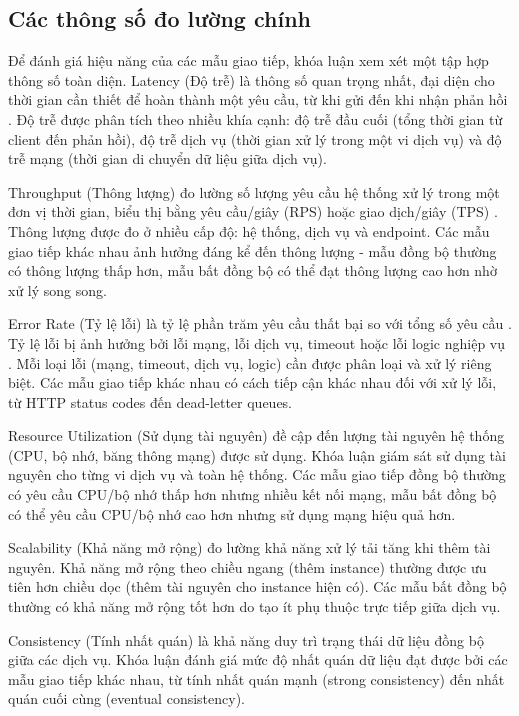 \subsection{Các thông số đo lường chính}
Để đánh giá hiệu năng của các mẫu giao tiếp, khóa luận xem xét một tập hợp thông số toàn diện. Latency (Độ trễ) là thông số quan trọng nhất, đại diện cho thời gian cần thiết để hoàn thành một yêu cầu, từ khi gửi đến khi nhận phản hồi \cite{jun2018}. Độ trễ được phân tích theo nhiều khía cạnh: độ trễ đầu cuối (tổng thời gian từ client đến phản hồi), độ trễ dịch vụ (thời gian xử lý trong một vi dịch vụ) và độ trễ mạng (thời gian di chuyển dữ liệu giữa dịch vụ).

Throughput (Thông lượng) đo lường số lượng yêu cầu hệ thống xử lý trong một đơn vị thời gian, biểu thị bằng yêu cầu/giây (RPS) hoặc giao dịch/giây (TPS) \cite{jun2018}. Thông lượng được đo ở nhiều cấp độ: hệ thống, dịch vụ và endpoint. Các mẫu giao tiếp khác nhau ảnh hưởng đáng kể đến thông lượng - mẫu đồng bộ thường có thông lượng thấp hơn, mẫu bất đồng bộ có thể đạt thông lượng cao hơn nhờ xử lý song song.

Error Rate (Tỷ lệ lỗi) là tỷ lệ phần trăm yêu cầu thất bại so với tổng số yêu cầu \cite{newman2015}. Tỷ lệ lỗi bị ảnh hưởng bởi lỗi mạng, lỗi dịch vụ, timeout hoặc lỗi logic nghiệp vụ \cite{richardson2019}. Mỗi loại lỗi (mạng, timeout, dịch vụ, logic) cần được phân loại và xử lý riêng biệt. Các mẫu giao tiếp khác nhau có cách tiếp cận khác nhau đối với xử lý lỗi, từ HTTP status codes đến dead-letter queues.

Resource Utilization (Sử dụng tài nguyên) đề cập đến lượng tài nguyên hệ thống (CPU, bộ nhớ, băng thông mạng) được sử dụng. Khóa luận giám sát sử dụng tài nguyên cho từng vi dịch vụ và toàn hệ thống. Các mẫu giao tiếp đồng bộ thường có yêu cầu CPU/bộ nhớ thấp hơn nhưng nhiều kết nối mạng, mẫu bất đồng bộ có thể yêu cầu CPU/bộ nhớ cao hơn nhưng sử dụng mạng hiệu quả hơn.

Scalability (Khả năng mở rộng) đo lường khả năng xử lý tải tăng khi thêm tài nguyên. Khả năng mở rộng theo chiều ngang (thêm instance) thường được ưu tiên hơn chiều dọc (thêm tài nguyên cho instance hiện có). Các mẫu bất đồng bộ thường có khả năng mở rộng tốt hơn do tạo ít phụ thuộc trực tiếp giữa dịch vụ.

Consistency (Tính nhất quán) là khả năng duy trì trạng thái dữ liệu đồng bộ giữa các dịch vụ. Khóa luận đánh giá mức độ nhất quán dữ liệu đạt được bởi các mẫu giao tiếp khác nhau, từ tính nhất quán mạnh (strong consistency) đến nhất quán cuối cùng (eventual consistency).

